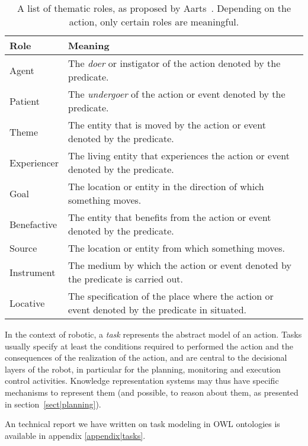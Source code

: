 \begin{table}
\begin{center}

\begin{tabular}{lp{12cm}}

\toprule
       Role & Meaning \\
\midrule
      Agent & The \emph{doer} or instigator of the action denoted by the predicate. \\
    Patient & The \emph{undergoer} of the action or event denoted by the predicate. \\
      Theme & The entity that is moved by the action or event denoted by the predicate. \\
Experiencer & The living entity that experiences the action or event denoted by the predicate. \\
       Goal & The location or entity in the direction of which something moves. \\
Benefactive & The entity that benefits from the action or event denoted by the predicate. \\
     Source & The location or entity from which something moves. \\
 Instrument & The medium by which the action or event denoted by the predicate is carried out. \\
   Locative & The specification of the place where the action or event denoted by the predicate in situated. \\
\bottomrule

\end{tabular}
\end{center}

\caption{A list of thematic roles, as proposed by Aarts~\cite{Aarts1997}.
Depending on the action, only certain roles are meaningful.}

\label{table|theta-roles}
\end{table}

In the context of robotic, a \emph{task} represents the abstract model of an
action. Tasks usually specify at least the conditions required to performed the
action and the consequences of the realization of the action, and are central
to the decisional layers of the robot, in particular for the planning,
monitoring and execution control activities. Knowledge representation systems
may thus have specific mechanisms to represent them (and possible, to reason
about them, as presented in section~\ref{sect|planning}).

An technical report we have written on task modeling in OWL ontologies is
available in appendix \ref{appendix|tasks}.

